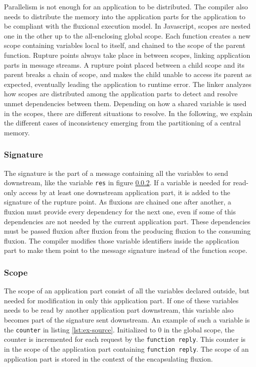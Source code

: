 Parallelism is not enough for an application to be distributed.
The compiler also needs to distribute the memory into the application parts for the application to be compliant with the fluxional execution model.
In Javascript, scopes are nested one in the other up to the all-enclosing global scope.
Each function creates a new scope containing variables local to itself, and chained to the scope of the parent function.
Rupture points always take place in between scopes, linking application parts in message streams.
A rupture point placed between a child scope and its parent breaks a chain of scope, and makes the child unable to access its parent as expected, eventually leading the application to runtime error.
The linker analyzes how scopes are distributed among the application parts to detect and resolve unmet dependencies between them.
Depending on how a shared variable is used in the scopes, there are different situations to resolve.
In the following, we explain the different cases of inconsistency emerging from the partitioning of a central memory.

\subsubsection{Signature}

The signature is the part of a message containing all the variables to send downstream, like the variable \texttt{res} in figure \ref{}\TODO.
If a variable is needed for read-only access by at least one downstream application part, it is added to the signature of the rupture point.
As fluxions are chained one after another, a fluxion must provide every dependency for the next one, even if some of this dependencies are not needed by the current application part.
These dependencies must be passed fluxion after fluxion from the producing fluxion to the consuming fluxion.
The compiler modifies those variable identifiers inside the application part to make them point to the message signature instead of the function scope.

\subsubsection{Scope}

The scope of an application part consist of all the variables declared outside, but needed for modification in only this application part.
If one of these variables needs to be read by another application part downstream, this variable also becomes part of the signature sent downstream.
An example of such a variable is the \texttt{counter} in listing \ref{lst:ex-source}. Initialized to 0 in the global scope, the counter is incremented for each request by the \texttt{function reply}.
This counter is in the scope of the application part containing \texttt{function reply}.
The scope of an application part is stored in the context of the encapsulating fluxion.

